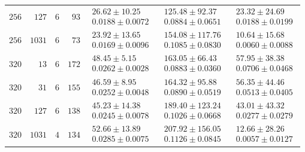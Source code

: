 \begin{tabular}{@{}rrrrrrr@{}}
  $256$ & $127$ & $6$ & $93$ & $\substack{26.62\mathbin{\pm}10.25\\0.0188\mathbin{\pm}0.0072}$ & $\substack{125.48\mathbin{\pm}92.37\\0.0884\mathbin{\pm}0.0651}$ & $\substack{23.32\mathbin{\pm}24.69\\0.0188\mathbin{\pm}0.0199}$ \\
  $256$ & $1031$ & $6$ & $73$ & $\substack{23.92\mathbin{\pm}13.65\\0.0169\mathbin{\pm}0.0096}$ & $\substack{154.08\mathbin{\pm}117.76\\0.1085\mathbin{\pm}0.0830}$ & $\substack{10.64\mathbin{\pm}15.68\\0.0060\mathbin{\pm}0.0088}$ \\
  $320$ & $13$ & $6$ & $172$ & $\substack{48.45\mathbin{\pm}5.15\\0.0262\mathbin{\pm}0.0028}$ & $\substack{163.05\mathbin{\pm}66.43\\0.0883\mathbin{\pm}0.0360}$ & $\substack{57.95\mathbin{\pm}38.38\\0.0706\mathbin{\pm}0.0468}$ \\
  $320$ & $31$ & $6$ & $155$ & $\substack{46.59\mathbin{\pm}8.95\\0.0252\mathbin{\pm}0.0048}$ & $\substack{164.32\mathbin{\pm}95.88\\0.0890\mathbin{\pm}0.0519}$ & $\substack{56.35\mathbin{\pm}44.46\\0.0513\mathbin{\pm}0.0405}$ \\
  $320$ & $127$ & $6$ & $138$ & $\substack{45.23\mathbin{\pm}14.38\\0.0245\mathbin{\pm}0.0078}$ & $\substack{189.40\mathbin{\pm}123.24\\0.1026\mathbin{\pm}0.0668}$ & $\substack{43.01\mathbin{\pm}43.32\\0.0277\mathbin{\pm}0.0279}$ \\
  $320$ & $1031$ & $4$ & $134$ & $\substack{52.66\mathbin{\pm}13.89\\0.0285\mathbin{\pm}0.0075}$ & $\substack{207.92\mathbin{\pm}156.05\\0.1126\mathbin{\pm}0.0845}$ & $\substack{12.66\mathbin{\pm}28.26\\0.0057\mathbin{\pm}0.0127}$ \\
  \bottomrule
\end{tabular}
